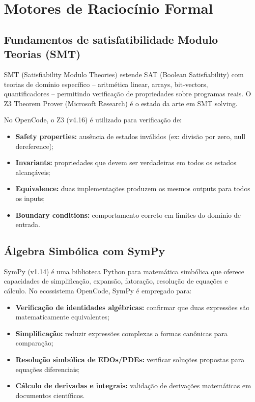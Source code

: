 \documentclass[12pt,a4paper,sumario=tradicional]{abntex2}
\begin{document}
\section{Motores de Raciocínio Formal}

\subsection{Fundamentos de satisfatibilidade Modulo Teorias (SMT)}

SMT (Satisfiability Modulo Theories) estende SAT (Boolean Satisfiability) com teorias de domínio específico -- aritmética linear, arrays, bit-vectors, quantificadores -- permitindo verificação de propriedades sobre programas reais. O Z3 Theorem Prover (Microsoft Research) é o estado da arte em SMT solving.

No OpenCode, o Z3 (v4.16) é utilizado para verificação de:
\begin{itemize}
    \item \textbf{Safety properties:} ausência de estados inválidos (ex: divisão por zero, null dereference);
    \item \textbf{Invariants:} propriedades que devem ser verdadeiras em todos os estados alcançáveis;
    \item \textbf{Equivalence:} duas implementações produzem os mesmos outputs para todos os inputs;
    \item \textbf{Boundary conditions:} comportamento correto em limites do domínio de entrada.
\end{itemize}

\subsection{Álgebra Simbólica com SymPy}

SymPy (v1.14) é uma biblioteca Python para matemática simbólica que oferece capacidades de simplificação, expansão, fatoração, resolução de equações e cálculo. No ecossistema OpenCode, SymPy é empregado para:

\begin{itemize}
    \item \textbf{Verificação de identidades algébricas:} confirmar que duas expressões são matematicamente equivalentes;
    \item \textbf{Simplificação:} reduzir expressões complexas a formas canônicas para comparação;
    \item \textbf{Resolução simbólica de EDOs/PDEs:} verificar soluções propostas para equações diferenciais;
    \item \textbf{Cálculo de derivadas e integrais:} validação de derivações matemáticas em documentos científicos.
\end{itemize}
\end{document}
